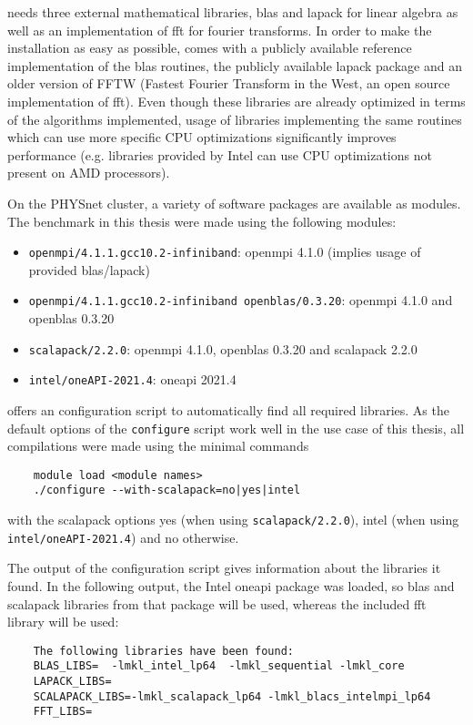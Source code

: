 \documentclass[main.tex]{subfiles}
\begin{document}
\QE needs three external mathematical libraries, \gls{blas} and \gls{lapack} for linear algebra as well as an implementation of \gls{fft} for fourier transforms.
In order to make the installation as easy as possible, \QE comes with a publicly available reference implementation of the \gls{blas} routines, the publicly available \gls{lapack} package and an older version of FFTW (Fastest Fourier Transform in the West, an open source implementation of \gls{fft}).
Even though these libraries are already optimized in terms of the algorithms implemented, usage of libraries implementing the same routines which can use more specific CPU optimizations significantly improves performance (e.g. libraries provided by Intel can use CPU optimizations not present on AMD processors).

On the PHYSnet cluster, a variety of software packages are available as modules.
The benchmark in this thesis were made using the following modules:
\begin{itemize}
    \item \texttt{openmpi/4.1.1.gcc10.2-infiniband}: \gls{openmpi} 4.1.0 (implies usage of \QE provided \gls{blas}/\gls{lapack})
    \item \texttt{openmpi/4.1.1.gcc10.2-infiniband openblas/0.3.20}: \gls{openmpi} 4.1.0 and \gls{openblas} 0.3.20
    \item \texttt{scalapack/2.2.0}: \gls{openmpi} 4.1.0, \gls{openblas} 0.3.20 and \gls{scalapack} 2.2.0
    \item \texttt{intel/oneAPI-2021.4}: \gls{oneapi} 2021.4
\end{itemize}

\QE offers an configuration script to automatically find all required libraries.
As the default options of the \texttt{configure} script work well in the use case of this thesis, all compilations were made using the minimal commands
\begin{verbatim}
    module load <module names>
    ./configure --with-scalapack=no|yes|intel
\end{verbatim}
with the scalapack options yes (when using \texttt{scalapack/2.2.0}), intel (when using \\ \texttt{intel/oneAPI-2021.4}) and no otherwise.

The output of the configuration script gives information about the libraries it found.
In the following output, the Intel \gls{oneapi} package was loaded, so \gls{blas} and \gls{scalapack} libraries from that package will be used, whereas the included \gls{fft} library will be used:
\begin{verbatim}
    The following libraries have been found:
    BLAS_LIBS=  -lmkl_intel_lp64  -lmkl_sequential -lmkl_core
    LAPACK_LIBS=
    SCALAPACK_LIBS=-lmkl_scalapack_lp64 -lmkl_blacs_intelmpi_lp64
    FFT_LIBS= 
\end{verbatim}
\end{document}
